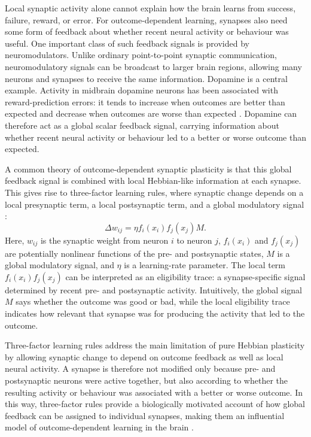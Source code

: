 Local synaptic activity alone cannot explain how the brain learns from success, failure, reward, or error. For outcome-dependent learning, synapses also need some form of feedback about whether recent neural activity or behaviour was useful. One important class of such feedback signals is provided by neuromodulators. Unlike ordinary point-to-point synaptic communication, neuromodulatory signals can be broadcast to larger brain regions, allowing many neurons and synapses to receive the same information. Dopamine is a central example. Activity in midbrain dopamine neurons has been associated with reward-prediction errors: it tends to increase when outcomes are better than expected and decrease when outcomes are worse than expected \parencite{schultz_neural_1997}. Dopamine can therefore act as a global scalar feedback signal, carrying information about whether recent neural activity or behaviour led to a better or worse outcome than expected.

A common theory of outcome-dependent synaptic plasticity is that this global feedback signal is combined with local Hebbian-like information at each synapse. This gives rise to three-factor learning rules, where synaptic change depends on a local presynaptic term, a local postsynaptic term, and a global modulatory signal \parencite{fremaux_neuromodulated_2016,gerstner_eligibility_2018}:
\begin{equation}
\Delta w_{ij} = \eta f_i(x_i) f_j(x_j) M .
\label{eq:three_factor_learning}
\end{equation}
Here, \(w_{ij}\) is the synaptic weight from neuron \(i\) to neuron \(j\), \(f_i(x_i)\) and \(f_j(x_j)\) are potentially nonlinear functions of the pre- and postsynaptic states, \(M\) is a global modulatory signal, and \(\eta\) is a learning-rate parameter. The local term \(f_i(x_i)f_j(x_j)\) can be interpreted as an eligibility trace: a synapse-specific signal determined by recent pre- and postsynaptic activity. Intuitively, the global signal \(M\) says whether the outcome was good or bad, while the local eligibility trace indicates how relevant that synapse was for producing the activity that led to the outcome.

Three-factor learning rules address the main limitation of pure Hebbian plasticity by allowing synaptic change to depend on outcome feedback as well as local neural activity. A synapse is therefore not modified only because pre- and postsynaptic neurons were active together, but also according to whether the resulting activity or behaviour was associated with a better or worse outcome. In this way, three-factor rules provide a biologically motivated account of how global feedback can be assigned to individual synapses, making them an influential model of outcome-dependent learning in the brain \parencite{fremaux_neuromodulated_2016,gerstner_eligibility_2018}.

